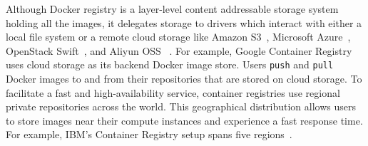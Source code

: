 Although Docker registry is a layer-level content addressable storage system holding all the images,
it delegates storage to drivers which interact with either a local file system or a remote cloud storage like Amazon S3~\cite{s3}, Microsoft Azure~\cite{azure}, OpenStack Swift~\cite{swift}, and Aliyun OSS~\cite{xxx} . 
For example, Google Container Registry~\cite{GoogleContainerRegistry} uses cloud storage as its backend Docker image store.
Users \texttt{push} and \texttt{pull} Docker images to and from their repositories that are stored on cloud storage. 
To facilitate a fast and high-availability service, container registries use regional private repositories across the world.  
This geographical distribution allows users to store images near their compute instances and experience a fast response time. 
For example, IBM's Container Registry setup spans five regions~\cite{dockerworkload}. 

%

